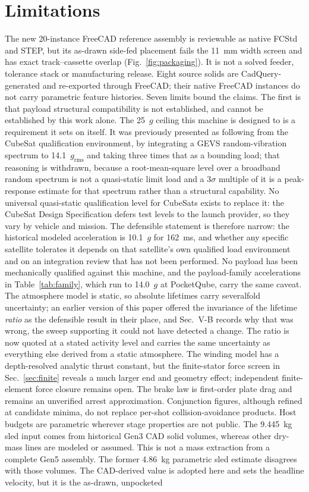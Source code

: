\documentclass[conference]{IEEEtran}
\begin{document}
\section{Limitations}\label{sec:lim}
The new 20-instance FreeCAD reference assembly is reviewable as native FCStd and STEP, but its as-drawn side-fed placement fails the 11~mm width screen and has exact track--cassette overlap (Fig.~\ref{fig:packaging}). It is not a solved feeder, tolerance stack or manufacturing release. Eight source solids are CadQuery-generated and re-exported through FreeCAD; their native FreeCAD instances do not carry parametric feature histories. Seven limits bound the claims. The first is that payload structural compatibility is not established, and cannot be established by this work alone. The 25~$g$ ceiling this machine is designed to is a requirement it sets on itself. It was previously presented as following from the CubeSat qualification environment, by integrating a GEVS random-vibration spectrum to 14.1~$g_{\mathrm{rms}}$ and taking three times that as a bounding load; that reasoning is withdrawn, because a root-mean-square level over a broadband random spectrum is not a quasi-static limit load and a $3\sigma$ multiple of it is a peak-response estimate for that spectrum rather than a structural capability. No universal quasi-static qualification level for CubeSats exists to replace it: the CubeSat Design Specification \cite{cds} defers test levels to the launch provider, so they vary by vehicle and mission. The defensible statement is therefore narrow: the historical modeled acceleration is 10.1~$g$ for 162~ms, and whether any specific satellite tolerates it depends on that satellite's own qualified load environment and on an integration review that has not been performed. No payload has been mechanically qualified against this machine, and the payload-family accelerations in Table~\ref{tab:family}, which run to 14.0~$g$ at PocketQube, carry the same caveat. The atmosphere model is static, so absolute lifetimes carry severalfold uncertainty; an earlier version of this paper offered the invariance of the lifetime \emph{ratio} as the defensible result in their place, and Sec.~V-B records why that was wrong, the sweep supporting it could not have detected a change. The ratio is now quoted at a stated activity level and carries the same uncertainty as everything else derived from a static atmosphere. The winding model has a depth-resolved analytic thrust constant, but the finite-stator force screen in Sec.~\ref{sec:finite} reveals a much larger end and geometry effect; independent finite-element force closure remains open. The brake law is first-order plate drag and remains an unverified arrest approximation. Conjunction figures, although refined at candidate minima, do not replace per-shot collision-avoidance products. Host budgets are parametric wherever stage properties are not public. The 9.445~kg sled input comes from historical Gen3 CAD solid volumes, whereas other dry-mass lines are modeled or assumed. This is not a mass extraction from a complete Gen5 assembly. The former 4.86~kg parametric sled estimate disagrees with those volumes. The CAD-derived value is adopted here and sets the headline velocity, but it is the as-drawn, unpocketed 
\end{document}

